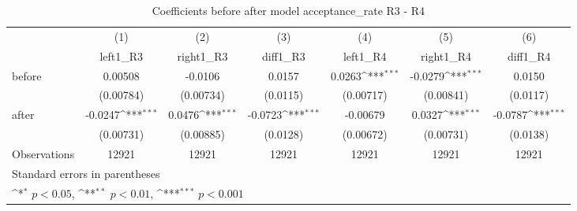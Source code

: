 \begin{table}[!ht]\centering \footnotesize
\def\sym#1{\ifmmode^{#1}\else\(^{#1}\)\fi}
\caption{Coefficients before after model acceptance\_rate R3 - R4}
\begin{tabular}{l*{6}{c}}
\hline\hline
                    &\multicolumn{1}{c}{(1)}&\multicolumn{1}{c}{(2)}&\multicolumn{1}{c}{(3)}&\multicolumn{1}{c}{(4)}&\multicolumn{1}{c}{(5)}&\multicolumn{1}{c}{(6)}\\
                    &\multicolumn{1}{c}{left1\_R3}&\multicolumn{1}{c}{right1\_R3}&\multicolumn{1}{c}{diff1\_R3}&\multicolumn{1}{c}{left1\_R4}&\multicolumn{1}{c}{right1\_R4}&\multicolumn{1}{c}{diff1\_R4}\\
\hline
before              &     0.00508         &     -0.0106         &      0.0157         &      0.0263\sym{***}&     -0.0279\sym{***}&      0.0150         \\
                    &   (0.00784)         &   (0.00734)         &    (0.0115)         &   (0.00717)         &   (0.00841)         &    (0.0117)         \\
[1em]
after               &     -0.0247\sym{***}&      0.0476\sym{***}&     -0.0723\sym{***}&    -0.00679         &      0.0327\sym{***}&     -0.0787\sym{***}\\
                    &   (0.00731)         &   (0.00885)         &    (0.0128)         &   (0.00672)         &   (0.00731)         &    (0.0138)         \\
\hline
Observations        &       12921         &       12921         &       12921         &       12921         &       12921         &       12921         \\
\hline\hline
\multicolumn{7}{l}{\footnotesize Standard errors in parentheses}\\
\multicolumn{7}{l}{\footnotesize \sym{*} \(p<0.05\), \sym{**} \(p<0.01\), \sym{***} \(p<0.001\)}\\
\end{tabular}
\end{table}
